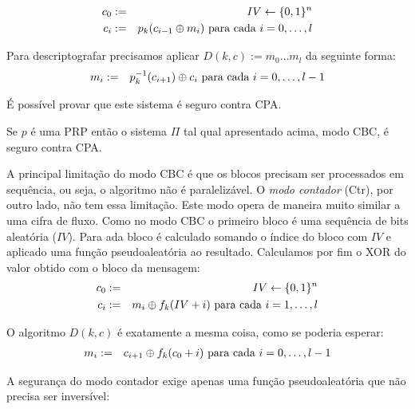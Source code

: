 \begin{eqnarray*}
  c_0 & := & IV \leftarrow \{0,1\}^n \\
  c_i & := & p_k(c_{i-1} \oplus m_i) \textrm{ para cada } i = 0, \dots, l
\end{eqnarray*}

Para descriptografar precisamos aplicar $D(k,c) := m_0 \dots m_l$ da seguinte forma:
\begin{eqnarray*}
  m_{i} & := & p_k^{-1}(c_{i+1}) \oplus c_{i} \textrm{ para cada } i = 0, \dots, l-1
\end{eqnarray*}

É possível provar que este sistema é seguro contra CPA.

\begin{theorem}
  Se $p$ é uma PRP então o sistema $\Pi$ tal qual apresentado acima, modo CBC, é seguro contra CPA.
\end{theorem}


A principal limitação do modo CBC é que os blocos precisam ser processados em sequência, ou seja, o algoritmo não é paralelizável.
O {\em modo contador} (Ctr), por outro lado, não tem essa limitação.
Este modo opera de maneira muito similar a uma cifra de fluxo.
Como no modo CBC o primeiro bloco é uma sequência de bits aleatória ($IV$).
Para ada bloco é calculado somando o índice do bloco com $IV$ e aplicado uma função pseudoaleatória ao resultado.
Calculamos por fim o XOR do valor obtido com o bloco da mensagem:
\begin{eqnarray*}
  c_0 & := & IV \leftarrow \{0,1\}^n \\
  c_i & := & m_i \oplus f_k(IV + i) \textrm{ para cada } i = 1, \dots, l
\end{eqnarray*} 

O algoritmo $D(k,c)$ é exatamente a mesma coisa, como se poderia esperar:
\begin{eqnarray*}
  m_i & := & c_{i+1} \oplus f_k(c_0 + i) \textrm{ para cada } i = 0, \dots, l-1
\end{eqnarray*} 

A segurança do modo contador exige apenas uma função pseudoaleatória que não precisa ser inversível:


